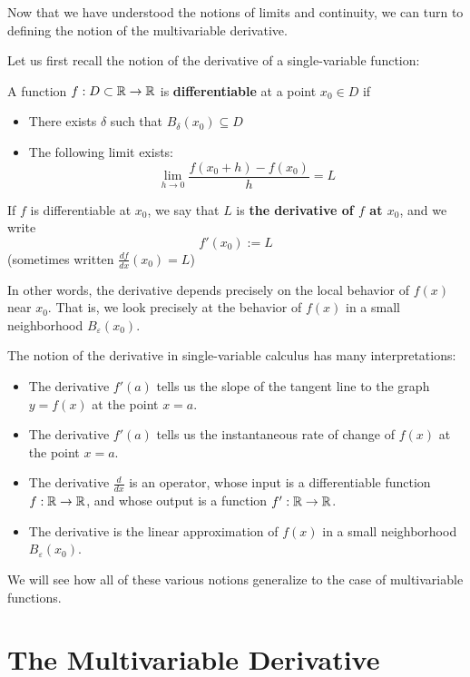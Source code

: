 Now that we have understood the notions of limits and continuity, we can turn to defining the notion of the multivariable derivative.

Let us first recall the notion of the derivative of a single-variable function:


\begin{definition}
    A function $f : D \subset \mathbb{R} \to \mathbb{R}$ is \textbf{differentiable} at a point $x_0 \in D$ if 

    \begin{itemize}
        \item There exists $\delta$ such that $B_\delta(x_0) \subseteq D$
        \item The following limit exists:  $$\lim_{h \to 0} \frac{f(x_0+h) - f(x_0)}{h} = L$$
    \end{itemize}

    If $f$ is differentiable at $x_0$, we say that $L$ is \textbf{the derivative of $f$ at $x_0$}, and we write $$f'(x_0) := L$$
    (sometimes written $\frac{df}{dx}(x_0) = L$)
    \end{definition}

In other words, the derivative depends precisely on the local behavior of $f(x)$ near $x_0$.  That is, we look precisely at the behavior of $f(x)$ in a small neighborhood $B_\varepsilon(x_0)$.



The notion of the derivative in single-variable calculus has many interpretations:

\begin{itemize}
    \item The derivative $f'(a)$ tells us the slope of the tangent line to the graph $y=f(x)$ at the point $x=a$.
    \item The derivative $f'(a)$ tells us the instantaneous rate of change of $f(x)$ at the point $x=a$.
    \item The derivative $\frac{d}{dx}$ is an operator, whose input is a differentiable function $f : \mathbb{R} \to \mathbb{R}$, and whose output is a function $f' : \mathbb{R} \to \mathbb{R}$.
    \item The derivative is the linear approximation of $f(x)$ in a small neighborhood $B_\varepsilon(x_0)$.
\end{itemize}

We will see how all of these various notions generalize to the case of multivariable functions.


\section{The Multivariable Derivative}


